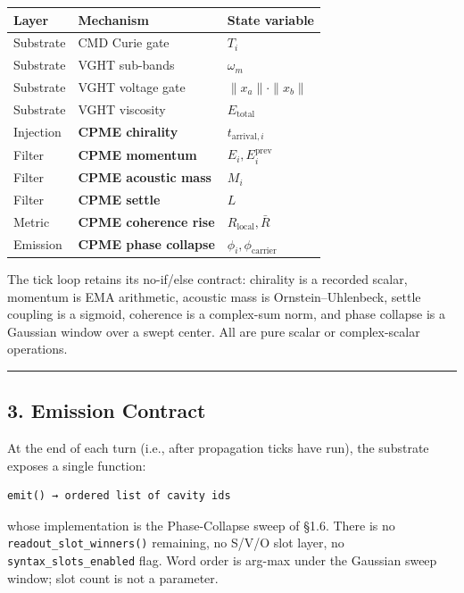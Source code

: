 \documentclass[
  11pt,
  a4paper,
]{article}
\begin{document}
\begin{longtable}[]{@{}lll@{}}
\toprule\noalign{}
Layer & Mechanism & State variable \\
\midrule\noalign{}
\endhead
\bottomrule\noalign{}
\endlastfoot
Substrate & CMD Curie gate & \(T_i\) \\
Substrate & VGHT sub-bands & \(\omega_m\) \\
Substrate & VGHT voltage gate & \(\| x_a \| \cdot \| x_b \|\) \\
Substrate & VGHT viscosity & \(E_{\text{total}}\) \\
Injection & \textbf{CPME chirality} & \(t_{\text{arrival}, i}\) \\
Filter & \textbf{CPME momentum} & \(E_i, E_i^{\text{prev}}\) \\
Filter & \textbf{CPME acoustic mass} & \(M_i\) \\
Filter & \textbf{CPME settle} & \(L\) \\
Metric & \textbf{CPME coherence rise} & \(R_{\text{local}}, \bar R\) \\
Emission & \textbf{CPME phase collapse} &
\(\phi_i, \phi_{\text{carrier}}\) \\
\end{longtable}

The tick loop retains its no-if/else contract: chirality is a recorded
scalar, momentum is EMA arithmetic, acoustic mass is
Ornstein--Uhlenbeck, settle coupling is a sigmoid, coherence is a
complex-sum norm, and phase collapse is a Gaussian window over a swept
center. All are pure scalar or complex-scalar operations.

\begin{center}\rule{0.5\linewidth}{0.5pt}\end{center}

\subsection{3. Emission Contract}\label{emission-contract}

At the end of each turn (i.e., after propagation ticks have run), the
substrate exposes a single function:

\begin{verbatim}
emit() → ordered list of cavity ids
\end{verbatim}

whose implementation is the Phase-Collapse sweep of §1.6. There is no
\texttt{readout\_slot\_winners()} remaining, no S/V/O slot layer, no
\texttt{syntax\_slots\_enabled} flag. Word order is arg-max under the
Gaussian sweep window; slot count is not a parameter.
\end{document}
